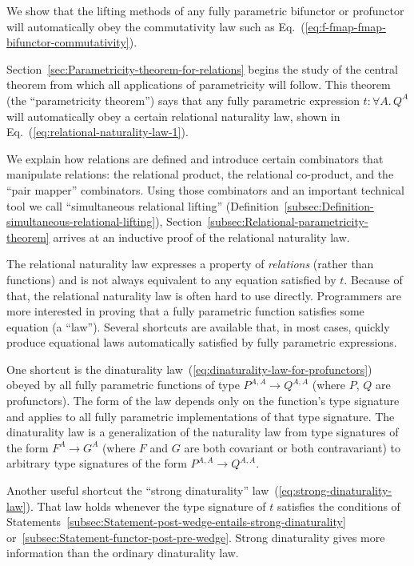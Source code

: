 We show that the lifting methods of any fully parametric bifunctor
or profunctor will automatically obey the commutativity law such as
Eq.~(\ref{eq:f-fmap-fmap-bifunctor-commutativity}). 

Section~\ref{sec:Parametricity-theorem-for-relations} begins the
study of the central theorem from which all applications of parametricity
will follow. This theorem (the \textsf{``}parametricity theorem\textsf{''}) says that
any fully parametric expression $t:\forall A.\,Q^{A}$ will automatically
obey a certain relational naturality law, shown in Eq.~(\ref{eq:relational-naturality-law-1}). 

We explain how relations are defined and introduce certain combinators
that manipulate relations: the relational product, the relational
co-product, and the \textsf{``}pair mapper\textsf{''} combinators. Using those combinators
and an important technical tool we call \textsf{``}simultaneous relational
lifting\textsf{''} (Definition~\ref{subsec:Definition-simultaneous-relational-lifting}),
Section~\ref{subsec:Relational-parametricity-theorem} arrives at
an inductive proof of the relational naturality law. 

The relational naturality law expresses a property of \emph{relations}
(rather than functions) and is not always equivalent to any equation
satisfied by $t$. Because of that, the relational naturality law
is often hard to use directly. Programmers are more interested in
proving that a fully parametric function satisfies some equation (a
\textsf{``}law\textsf{''}). Several shortcuts are available that, in most cases, quickly
produce equational laws automatically satisfied by fully parametric
expressions.

One shortcut is the dinaturality law~(\ref{eq:dinaturality-law-for-profunctors})
obeyed by all fully parametric functions of type $P^{A,A}\rightarrow Q^{A,A}$
(where $P$, $Q$ are profunctors). The form of the law depends only
on the function\textsf{'}s type signature and applies to all fully parametric
implementations of that type signature. The dinaturality law is a
generalization of the naturality law from type signatures of the form
$F^{A}\rightarrow G^{A}$ (where $F$ and $G$ are both covariant
or both contravariant) to arbitrary type signatures of the form $P^{A,A}\rightarrow Q^{A,A}$.

Another useful shortcut the \textsf{``}strong dinaturality\textsf{''} law~(\ref{eq:strong-dinaturality-law}).
That law holds whenever the type signature of $t$ satisfies the conditions
of Statements~\ref{subsec:Statement-post-wedge-entails-strong-dinaturality}
or~\ref{subsec:Statement-functor-post-pre-wedge}. Strong dinaturality
gives more information than the ordinary dinaturality law.

